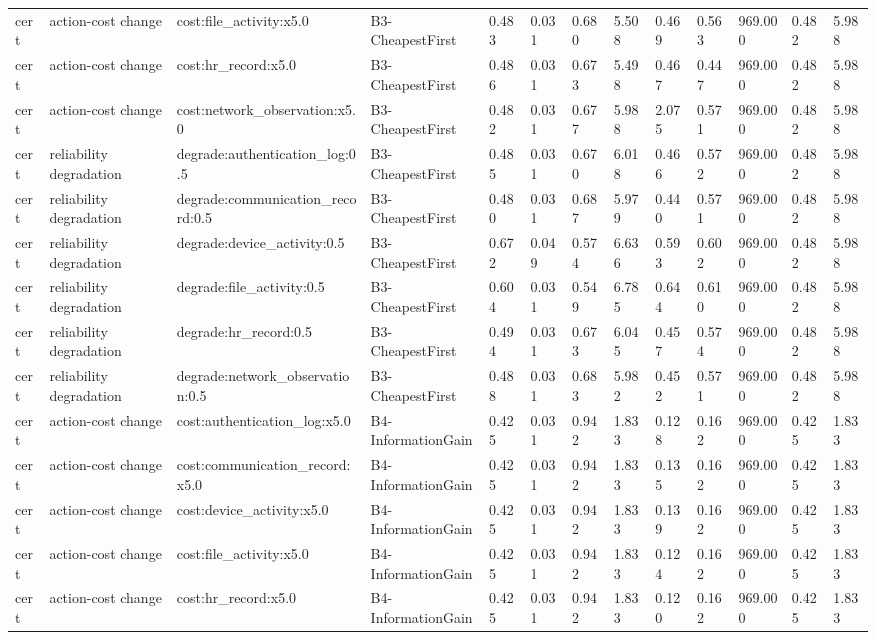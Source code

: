 \begin{table}[!ht]
{\begin{tabular}{lllllllllllll}
cert & action-cost change & cost:file\_activity:x5.0 & B3-CheapestFirst & 0.483 & 0.031 & 0.680 & 5.508 & 0.469 & 0.563 & 969.000 & 0.482 & 5.988 \\
cert & action-cost change & cost:hr\_record:x5.0 & B3-CheapestFirst & 0.486 & 0.031 & 0.673 & 5.498 & 0.467 & 0.447 & 969.000 & 0.482 & 5.988 \\
cert & action-cost change & cost:network\_observation:x5.0 & B3-CheapestFirst & 0.482 & 0.031 & 0.677 & 5.988 & 2.075 & 0.571 & 969.000 & 0.482 & 5.988 \\
cert & reliability degradation & degrade:authentication\_log:0.5 & B3-CheapestFirst & 0.485 & 0.031 & 0.670 & 6.018 & 0.466 & 0.572 & 969.000 & 0.482 & 5.988 \\
cert & reliability degradation & degrade:communication\_record:0.5 & B3-CheapestFirst & 0.480 & 0.031 & 0.687 & 5.979 & 0.440 & 0.571 & 969.000 & 0.482 & 5.988 \\
cert & reliability degradation & degrade:device\_activity:0.5 & B3-CheapestFirst & 0.672 & 0.049 & 0.574 & 6.636 & 0.593 & 0.602 & 969.000 & 0.482 & 5.988 \\
cert & reliability degradation & degrade:file\_activity:0.5 & B3-CheapestFirst & 0.604 & 0.031 & 0.549 & 6.785 & 0.644 & 0.610 & 969.000 & 0.482 & 5.988 \\
cert & reliability degradation & degrade:hr\_record:0.5 & B3-CheapestFirst & 0.494 & 0.031 & 0.673 & 6.045 & 0.457 & 0.574 & 969.000 & 0.482 & 5.988 \\
cert & reliability degradation & degrade:network\_observation:0.5 & B3-CheapestFirst & 0.488 & 0.031 & 0.683 & 5.982 & 0.452 & 0.571 & 969.000 & 0.482 & 5.988 \\
cert & action-cost change & cost:authentication\_log:x5.0 & B4-InformationGain & 0.425 & 0.031 & 0.942 & 1.833 & 0.128 & 0.162 & 969.000 & 0.425 & 1.833 \\
cert & action-cost change & cost:communication\_record:x5.0 & B4-InformationGain & 0.425 & 0.031 & 0.942 & 1.833 & 0.135 & 0.162 & 969.000 & 0.425 & 1.833 \\
cert & action-cost change & cost:device\_activity:x5.0 & B4-InformationGain & 0.425 & 0.031 & 0.942 & 1.833 & 0.139 & 0.162 & 969.000 & 0.425 & 1.833 \\
cert & action-cost change & cost:file\_activity:x5.0 & B4-InformationGain & 0.425 & 0.031 & 0.942 & 1.833 & 0.124 & 0.162 & 969.000 & 0.425 & 1.833 \\
cert & action-cost change & cost:hr\_record:x5.0 & B4-InformationGain & 0.425 & 0.031 & 0.942 & 1.833 & 0.120 & 0.162 & 969.000 & 0.425 & 1.833 \\

\end{tabular}}
\end{table}

